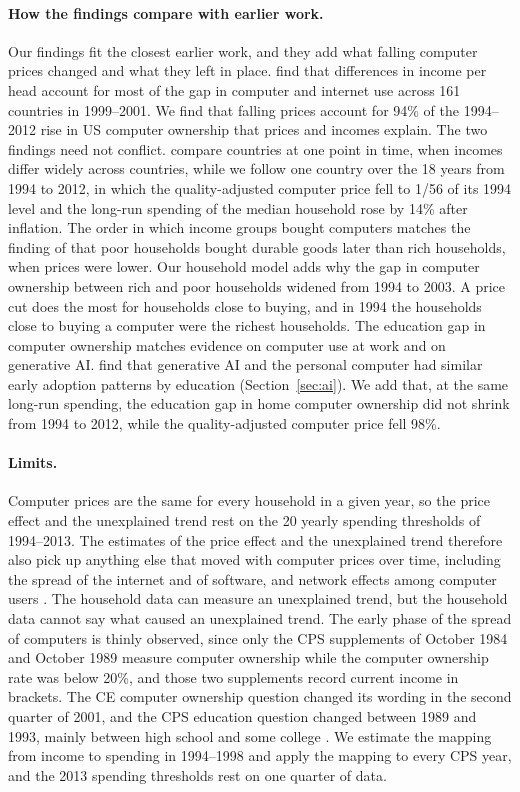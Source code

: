 \documentclass[11pt]{article}
\begin{document}
\paragraph{How the findings compare with earlier work.} Our findings fit the closest earlier work, and they add what falling computer prices changed and what they left in place. \citet{chinn2007} find that differences in income per head account for most of the gap in computer and internet use across 161 countries in 1999--2001. We find that falling prices account for 94\% of the 1994--2012 rise in US computer ownership that prices and incomes explain. The two findings need not conflict. \citet{chinn2007} compare countries at one point in time, when incomes differ widely across countries, while we follow one country over the 18 years from 1994 to 2012, in which the quality-adjusted computer price fell to 1/56 of its 1994 level and the long-run spending of the median household rose by 14\% after inflation. The order in which income groups bought computers matches the finding of \citet[p.~111]{greenwood2005} that poor households bought durable goods later than rich households, when prices were lower. Our household model adds why the gap in computer ownership between rich and poor households widened from 1994 to 2003. A price cut does the most for households close to buying, and in 1994 the households close to buying a computer were the richest households. The education gap in computer ownership matches evidence on computer use at work \citep{riddell2017} and on generative AI. \citet{bick2024} find that generative AI and the personal computer had similar early adoption patterns by education (Section~\ref{sec:ai}). We add that, at the same long-run spending, the education gap in home computer ownership did not shrink from 1994 to 2012, while the quality-adjusted computer price fell 98\%.

\paragraph{Limits.} Computer prices are the same for every household in a given year, so the price effect and the unexplained trend rest on the 20 yearly spending thresholds of 1994--2013. The estimates of the price effect and the unexplained trend therefore also pick up anything else that moved with computer prices over time, including the spread of the internet and of software, and network effects among computer users \citep{goolsbee2002}. The household data can measure an unexplained trend, but the household data cannot say what caused an unexplained trend. The early phase of the spread of computers is thinly observed, since only the CPS supplements of October 1984 and October 1989 measure computer ownership while the computer ownership rate was below 20\%, and those two supplements record current income in brackets. The CE computer ownership question changed its wording in the second quarter of 2001, and the CPS education question changed between 1989 and 1993, mainly between high school and some college \citep{jaeger1997}. We estimate the mapping from income to spending in 1994--1998 and apply the mapping to every CPS year, and the 2013 spending thresholds rest on one quarter of data.
\end{document}
